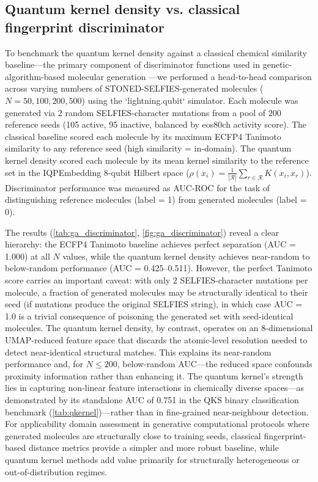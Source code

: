 \documentclass[11pt,a4paper]{article}
\begin{document}
\subsection{Quantum kernel density vs. classical fingerprint discriminator}

To benchmark the quantum kernel density against a classical chemical similarity baseline---the primary component of discriminator functions used in genetic-algorithm-based molecular generation \citep{jensen2019augmenting}---we performed a head-to-head comparison across varying numbers of STONED-SELFIES-generated molecules ($N = 50, 100, 200, 500$) using the `lightning.qubit` simulator. Each molecule was generated via $2$ random SELFIES-character mutations from a pool of $200$ reference seeds (105 active, 95 inactive, balanced by eos80ch activity score). The classical baseline scored each molecule by its maximum ECFP4 Tanimoto similarity to any reference seed (high similarity = in-domain). The quantum kernel density scored each molecule by its mean kernel similarity to the reference set in the IQPEmbedding 8-qubit Hilbert space ($\rho(x_i) = \frac{1}{|\mathcal{R}|}\sum_{r \in \mathcal{R}} K(x_i, x_r)$). Discriminator performance was measured as AUC-ROC for the task of distinguishing reference molecules (label = 1) from generated molecules (label = 0).

The results (\cref{tab:ga_discriminator}, \cref{fig:ga_discriminator}) reveal a clear hierarchy: the ECFP4 Tanimoto baseline achieves perfect separation (AUC = \num{1.000}) at all $N$ values, while the quantum kernel density achieves near-random to below-random performance (AUC = \numrange{0.425}{0.511}). However, the perfect Tanimoto score carries an important caveat: with only $2$ SELFIES-character mutations per molecule, a fraction of generated molecules may be structurally identical to their seed (if mutations produce the original SELFIES string), in which case AUC = \num{1.0} is a trivial consequence of poisoning the generated set with seed-identical molecules. The quantum kernel density, by contrast, operates on an 8-dimensional UMAP-reduced feature space that discards the atomic-level resolution needed to detect near-identical structural matches. This explains its near-random performance and, for $N \leq 200$, below-random AUC---the reduced space 
confounds proximity information rather than enhancing it. The quantum kernel's strength lies in capturing non-linear feature interactions in chemically 
diverse spaces---as demonstrated by its standalone AUC of \num{0.751} in the QKS binary classification benchmark (\cref{tab:qkernel})---rather than 
in fine-grained near-neighbour detection. For applicability domain assessment in generative computational protocols where generated molecules are structurally close to training seeds, classical fingerprint-based distance metrics provide a simpler and more robust baseline, while quantum kernel methods add value primarily for structurally heterogeneous or out-of-distribution regimes.
\end{document}
